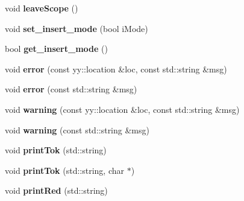 \begin{DoxyCompactItemize}
\item 
\hypertarget{classCCompiler_a2bccef2eb5e1f9a822ebca90f744ac2f}{void {\bfseries leave\-Scope} ()}\label{classCCompiler_a2bccef2eb5e1f9a822ebca90f744ac2f}

\item 
\hypertarget{classCCompiler_a0517c73a064cdbd86b9d538464bf72fc}{void {\bfseries set\-\_\-insert\-\_\-mode} (bool i\-Mode)}\label{classCCompiler_a0517c73a064cdbd86b9d538464bf72fc}

\item 
\hypertarget{classCCompiler_a947d3b408eea7a9365b9d05f6f247142}{bool {\bfseries get\-\_\-insert\-\_\-mode} ()}\label{classCCompiler_a947d3b408eea7a9365b9d05f6f247142}

\item 
\hypertarget{classCCompiler_aeb15aaabe4c6eba50ae6448dc994d720}{void {\bfseries error} (const yy\-::location \&loc, const std\-::string \&msg)}\label{classCCompiler_aeb15aaabe4c6eba50ae6448dc994d720}

\item 
\hypertarget{classCCompiler_a42f25efb480223b1bf7a98606d57b8d4}{void {\bfseries error} (const std\-::string \&msg)}\label{classCCompiler_a42f25efb480223b1bf7a98606d57b8d4}

\item 
\hypertarget{classCCompiler_a078454badd5c6ecb66c9b177bf8e45e2}{void {\bfseries warning} (const yy\-::location \&loc, const std\-::string \&msg)}\label{classCCompiler_a078454badd5c6ecb66c9b177bf8e45e2}

\item 
\hypertarget{classCCompiler_a763a49b094c39f1105cb41be54b3cb13}{void {\bfseries warning} (const std\-::string \&msg)}\label{classCCompiler_a763a49b094c39f1105cb41be54b3cb13}

\item 
\hypertarget{classCCompiler_ab1586bbdd6ad1ca6dace49e78bdd77fe}{void {\bfseries print\-Tok} (std\-::string)}\label{classCCompiler_ab1586bbdd6ad1ca6dace49e78bdd77fe}

\item 
\hypertarget{classCCompiler_af7c375c2f9cdd73162714b95391185d9}{void {\bfseries print\-Tok} (std\-::string, char $\ast$)}\label{classCCompiler_af7c375c2f9cdd73162714b95391185d9}

\item 
\hypertarget{classCCompiler_a417594ba72bfe40add794c79c7c740c1}{void {\bfseries print\-Red} (std\-::string)}\label{classCCompiler_a417594ba72bfe40add794c79c7c740c1}


\end{DoxyCompactItemize}
